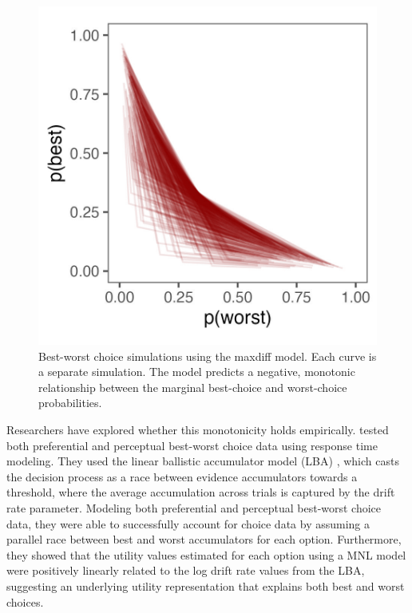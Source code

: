 \begin{figure}
   \includegraphics[width=150mm]{figures/maxdiff_sim_monotonic.jpeg}
   \caption{Best-worst choice simulations using the maxdiff model. Each curve is a separate simulation. The model predicts a negative, monotonic relationship between the marginal best-choice and worst-choice probabilities.}
   \label{fig:maxdiff_sim}
\end{figure}

Researchers have explored whether this monotonicity holds empirically. \textcite{hawkinsIntegratingCognitiveProcess2014a} tested both preferential and perceptual best-worst choice data using response time modeling. They used the linear ballistic accumulator model (LBA) \parencite{brownSimplestCompleteModel2008b}, which casts the decision process as a race between evidence accumulators towards a threshold, where the average accumulation across trials is captured by the drift rate parameter. Modeling both preferential and perceptual best-worst choice data, they were able to successfully account for choice data by assuming a parallel race between best and worst accumulators for each option. Furthermore, they showed that the utility values estimated for each option using a MNL model were positively linearly related to the log drift rate values from the LBA, suggesting an underlying utility representation that explains both best and worst choices. 

